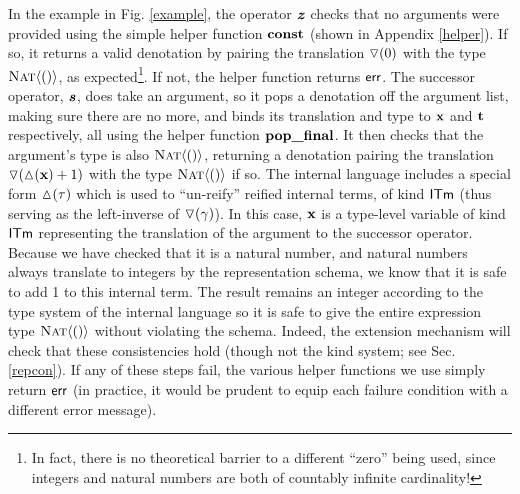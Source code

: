 \documentclass{llncs}
\begin{document}
In the example in Fig. \ref{example}, the operator $\textbf{\textit{z}}$ checks that no arguments were provided using the simple helper function ${\textbf{const}}$ (shown in Appendix \ref{helper}). If so, it returns a valid denotation by pairing the translation $\triangledown(0)$ with the type $\textsc{Nat}\langle()\rangle$, as expected\footnote{In fact, there is no theoretical barrier to a different ``zero'' being used, since integers and natural numbers are both of countably infinite cardinality!}. If not, the helper function returns ${\sf err}$. The successor operator, $\textbf{\textit{s}}$, does take an argument, so it pops a denotation off the argument list, making sure there are no more, and binds its translation and type to ${\textbf{x}}$ and ${\textbf{t}}$ respectively, all using the helper function ${\textbf{pop\_final}}$. It then checks that the argument's type is also $\textsc{Nat}\langle()\rangle$, returning a denotation pairing the translation $\triangledown(\vartriangle\hspace{-2.5pt}({\textbf{x}}) + 1)$ with the type $\textsc{Nat}\langle()\rangle$ if so. The internal language includes a special form $\vartriangle\hspace{-2.5pt}(\tau)$ which is used to ``un-reify'' reified internal terms, of kind $\textsf{ITm}$ (thus serving as the left-inverse of $\triangledown(\gamma)$). In this case, ${\textbf{x}}$ is a type-level variable of kind $\textsf{ITm}$ representing the translation of the argument to the successor operator. Because we have checked that it is a natural number, and natural numbers always translate to integers by the representation schema, we know that it is safe to add 1 to this internal term. The result remains an integer according to the type system of the internal language so it is safe to give the entire expression type $\textsc{Nat}\langle()\rangle$ without violating the schema. Indeed, the extension mechanism will check that these consistencies hold (though not the kind system; see Sec. \ref{repcon}). If any of these steps fail, the various helper functions we use simply return ${\sf err}$ (in practice, it would be prudent to equip each failure condition with a different error message).

\end{document}
